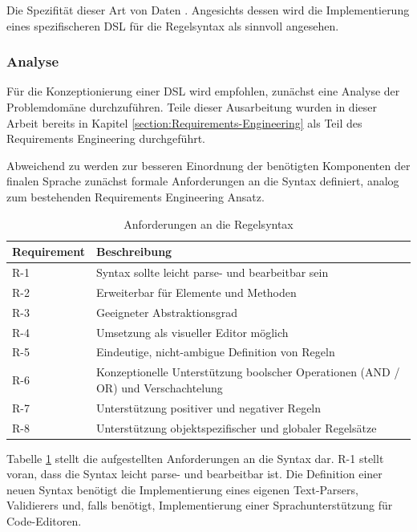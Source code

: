 Die Spezifität dieser Art von Daten  \parencite[S. 323]{mernikWhenHowDevelop2005}. Angesichts dessen wird die Implementierung eines spezifischeren DSL für die Regelsyntax als sinnvoll angesehen.

\subsubsection{Analyse}

Für die Konzeptionierung einer DSL wird empfohlen, zunächst eine Analyse der Problemdomäne durchzuführen. Teile dieser Ausarbeitung wurden in dieser Arbeit bereits in Kapitel \ref{section:Requirements-Engineering} als Teil des Requirements Engineering durchgeführt.

Abweichend zu \textcite{mernikWhenHowDevelop2005} werden zur besseren Einordnung der benötigten Komponenten der finalen Sprache zunächst formale Anforderungen an die Syntax definiert, analog zum bestehenden Requirements Engineering Ansatz.

\begin{table}[h]
\centering
\begin{tabular}{|p{2.5cm}|p{10.5cm}|}
\hline
\textbf{Requirement} & \textbf{Beschreibung} \\
\hline\hline
R-1 & Syntax sollte leicht parse- und bearbeitbar sein \\ \hline
R-2 & Erweiterbar für Elemente und Methoden \\ \hline
R-3 & Geeigneter Abstraktionsgrad \\ \hline
R-4 & Umsetzung als visueller Editor möglich \\ \hline
R-5 & Eindeutige, nicht-ambigue Definition von Regeln \\ \hline
R-6 & Konzeptionelle Unterstützung boolscher Operationen (AND / OR) und Verschachtelung \\ \hline
R-7 & Unterstützung positiver und negativer Regeln \\ \hline
R-8 & Unterstützung objektspezifischer und globaler Regelsätze \\ \hline
\end{tabular}
\caption{Anforderungen an die Regelsyntax}
\label{tab:syntax-requirements}
\end{table}

Tabelle \ref{tab:syntax-requirements} stellt die aufgestellten Anforderungen an die Syntax dar. R-1 stellt voran, dass die Syntax leicht parse- und bearbeitbar ist. Die Definition einer neuen Syntax benötigt die Implementierung eines eigenen Text-Parsers, Validierers und, falls benötigt, Implementierung einer Sprachunterstützung für Code-Editoren.

